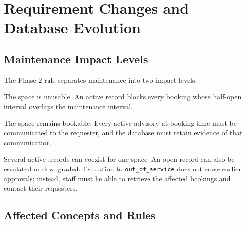 \section{Requirement Changes and Database Evolution}

\subsection{Maintenance Impact Levels}

The Phase 2 rule separates maintenance into two impact levels:

\begin{description}[style=nextline]
  \item[\texttt{out\_of\_service}]
  The space is unusable. An active record blocks every booking whose half-open interval overlaps the maintenance interval.

  \item[\texttt{advisory}]
  The space remains bookable. Every active advisory at booking time must be communicated to the requester, and the database must retain evidence of that communication.
\end{description}

Several active records can coexist for one space. An open record can also be escalated or downgraded. Escalation to \texttt{out\_of\_service} does not erase earlier approvals; instead, staff must be able to retrieve the affected bookings and contact their requesters.

\subsection{Affected Concepts and Rules}

